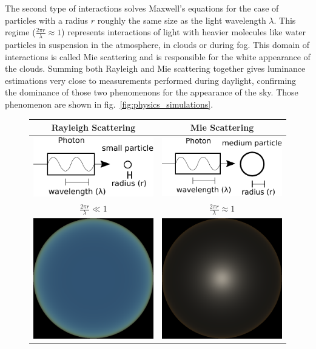 The second type of interactions solves Maxwell's equations for the case of particles with a radius $r$ roughly the same size as the light wavelength $\lambda$. This regime ($\frac{2\pi r}{\lambda} \approx 1$) represents interactions of light with heavier molecules like water particles in suspension in the atmosphere, in clouds or during fog. This domain of interactions is called Mie scattering and is responsible for the white appearance of the clouds. Summing both Rayleigh and Mie scattering together gives luminance estimations very close to measurements performed during daylight, confirming the dominance of those two phenomenons for the appearance of the sky. Those phenomenon are shown in fig.~\ref{fig:physics_simulations}.

\begin{figure}
\centering
\newcommand\Tstrut{\rule{0pt}{1\normalbaselineskip}}         %
\newcommand\Bstrut{\rule[-1.5em]{0pt}{0pt}}   %
\begin{tabular}{|c|c|}
\hline
\Tstrut Rayleigh Scattering & Mie Scattering \\ \hline
\rule{0pt}{5\normalbaselineskip}\includegraphics[width=0.25\linewidth]{simulation/small_particle.pdf} &
\includegraphics[width=0.25\linewidth]{simulation/medium_particle.pdf}\\
\rule{0pt}{1.5\normalbaselineskip}\Bstrut $\frac{2\pi r}{\lambda} \ll 1$ & $\frac{2\pi r}{\lambda} \approx 1$\\ \hline
\includegraphics[width=0.25\linewidth]{simulation/skydome_rayleigh.png} &
\includegraphics[width=0.25\linewidth]{simulation/skydome_mie.png} \\ \hline

\end{tabular}
\end{figure}
